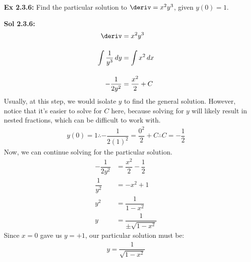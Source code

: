 \begin{tcolorbox}[example]
    \textbf{Ex 2.3.6: } Find the particular solution to $\deriv = x^2y^3$, given $y(0) = 1$.
\end{tcolorbox}
\begin{tcolorbox}[solution]
    \textbf{Sol 2.3.6: } \begin{align*}
        \deriv &= x^2y^3 \\[11pt]
        \int \dfrac{1}{y^3} \, dy &= \int x^2 \, dx \\[11pt]
        -\dfrac{1}{2y^2} &= \dfrac{x^2}{2} + C
    \end{align*}
    Usually, at this step, we would isolate $y$ to find the general solution. However, notice that it's easier to solve for $C$ here, because solving for $y$ will likely result in nested fractions, which can be difficult to work with. \begin{align*}
        y(0) = 1 \therefore -\dfrac{1}{2(1)^2} = \dfrac{0^2}{2} + C \therefore C = -\dfrac{1}{2}
    \end{align*}
    Now, we can continue solving for the particular solution. \begin{align*}
        -\dfrac{1}{2y^2} &= \dfrac{x^2}{2} - \dfrac{1}{2} \\[11pt]
        \dfrac{1}{y^2} &= -x^2 + 1 \\[11pt]
        y^2 &= \dfrac{1}{1 - x^2} \\[11pt]
        y &= \dfrac{1}{\pm\sqrt{1 - x^2}}
    \end{align*}
    Since $x = 0$ gave us $y = +1$, our particular solution must be: \begin{align*}
        \boxed{y = \dfrac{1}{\sqrt{1 - x^2}}}
    \end{align*}
\end{tcolorbox} \vspace{11pt}

